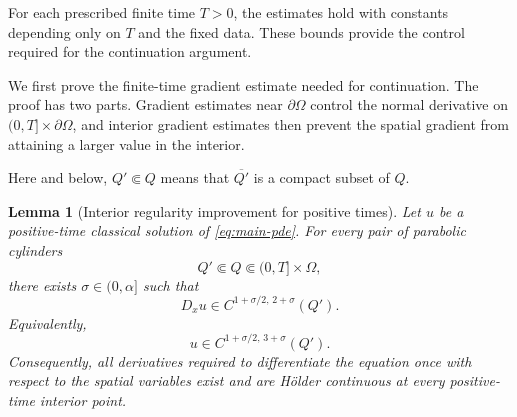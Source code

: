 \documentclass[11pt]{article}
\newtheorem{lemma}[theorem]{Lemma}
\theoremstyle{remark}
\begin{document}
For each prescribed finite time \(T>0\), the estimates hold with constants
depending only on \(T\) and the fixed data. These bounds provide the control
required for the continuation argument.

We first prove the finite-time gradient estimate needed for continuation.  The proof has two parts.  Gradient estimates near $\partial\Omega$ control the normal derivative on $(0,T]\times\partial\Omega$, and interior gradient estimates then prevent the spatial gradient from attaining a larger value in the interior.

Here and below, $Q'\Subset Q$ means that $\overline{Q'}$ is a compact
subset of $Q$.
\begin{lemma}[Interior regularity improvement for positive times]
\label{lem:interior-bootstrap}
Let $u$ be a positive-time classical solution of
\eqref{eq:main-pde}. For every pair of parabolic cylinders
\[
Q'\Subset Q\Subset (0,T]\times\Omega,
\]
there exists $\sigma\in(0,\alpha]$ such that
\[
D_xu\in C^{1+\sigma/2,\,2+\sigma}(Q').
\]
Equivalently,
\[
u\in C^{1+\sigma/2,\,3+\sigma}(Q').
\]
Consequently, all derivatives required to differentiate the equation once
with respect to the spatial variables exist and are H\"older continuous at
every positive-time interior point.
\end{lemma}
\end{document}

